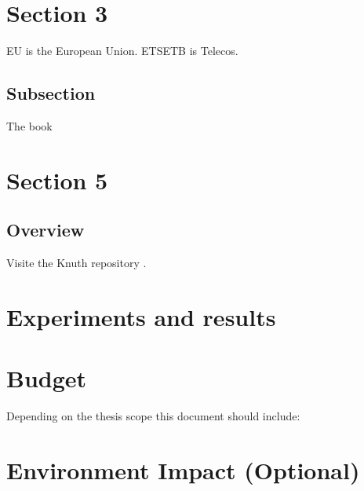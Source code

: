 \documentclass[a4paper,12pt]{article}
\begin{document}


\newpage
\section{Section 3}
\label{sec:sec3}

\lipsum[4] \ac{EU} is the European Union. \lipsum[5]
\lipsum[6] \ac{ETSETB} is Telecos. \lipsum[7]

\subsection{Subsection}
\label{sec:subsec3.1}
The book \cite{latexcompanion} \lipsum[15]

\newpage
\section{Section 5}
\label{sec:sect5}
\lipsum[4]

\subsection{Overview}
\label{subsec:sect5Overview}
\lipsum[10]
Visite the Knuth repository \cite{knuthwebsite}.

\clearpage
\section{Experiments and results}
\label{sec:tests}
\lipsum[9]

\clearpage
\section{Budget}
{
\foreignlanguage{english}{Depending on the thesis scope this document should include:}}

\clearpage
\section[Environment Impact (Optional)]{{Environment Impact (Optional)}}
\end{document}
